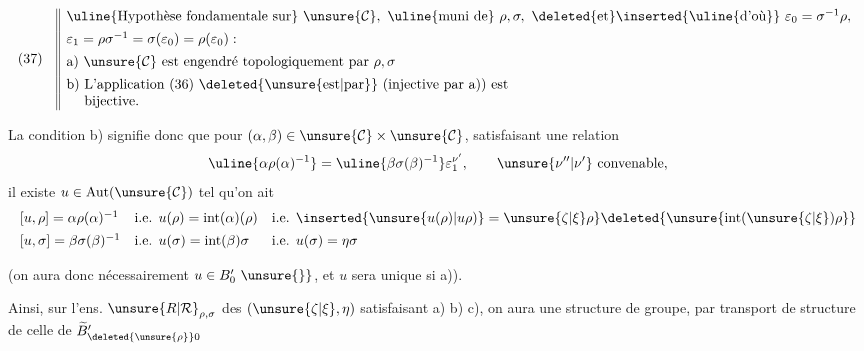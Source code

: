 
\[
(37)\quad
\begin{array}{||l}
\text{\uline{Hypothèse fondamentale sur} }\unsure{\mathcal{C}},\ 
\text{\uline{muni de} }\rho,\sigma,\ 
\text{\deleted{et}\inserted{\uline{d'où}} }\varepsilon_0=\sigma^{-1}\rho,\\[1ex]
\varepsilon_1=\rho\sigma^{-1}=\sigma(\varepsilon_0)=\rho(\varepsilon_0):\\[1ex]
\text{a) }\unsure{\mathcal{C}}\text{ est engendré topologiquement par }\rho,\sigma\\[1ex]
\text{b) L'application (36) \deleted{\unsure{est|par}} (injective par a)) est}\\
\text{\phantom{b) }bijective.}
\end{array}
\]


La condition b) signifie donc que pour
$(\alpha,\beta)\in\unsure{\mathcal{C}}\times\unsure{\mathcal{C}}$,
satisfaisant une relation
\[
\uline{\alpha\rho(\alpha)^{-1}}
=\uline{\beta\sigma(\beta)^{-1}}\varepsilon_1^{\nu'},
\qquad \unsure{\nu''|\nu'}\text{ convenable},
\]
il existe $u\in\operatorname{Aut}(\unsure{\mathcal{C}})$ tel qu'on ait
\[
\begin{array}{lll}
[u,\rho]=\alpha\rho(\alpha)^{-1}&
\text{i.e. }u(\rho)=\operatorname{int}(\alpha)(\rho)&
\text{i.e. }\inserted{\unsure{u(\rho)|u\rho)}=\unsure{\zeta|\xi}\rho}
\deleted{\unsure{\operatorname{int}(\unsure{\zeta|\xi})\rho}}\\[1ex]
[u,\sigma]=\beta\sigma(\beta)^{-1}&
\text{i.e. }u(\sigma)=\operatorname{int}(\beta)\sigma&
\text{i.e. }u(\sigma)=\eta\sigma
\end{array}
\]

\margin{$\unsure{\bullet}$}
(on aura donc nécessairement $u\in B'_0\ \unsure{\}}$, et
$u$ sera unique si  a)).

Ainsi, sur l'ens.  $\unsure{R|\mathcal{R}}_{\rho,\sigma}$ des $(\unsure{\zeta|\xi},\eta)$ satisfaisant
a) b) c), on aura une structure de groupe, \unsure{+|et}  par transport de structure de celle de
$\widetilde{B}'_{\deleted{\unsure{\rho}}0}$

